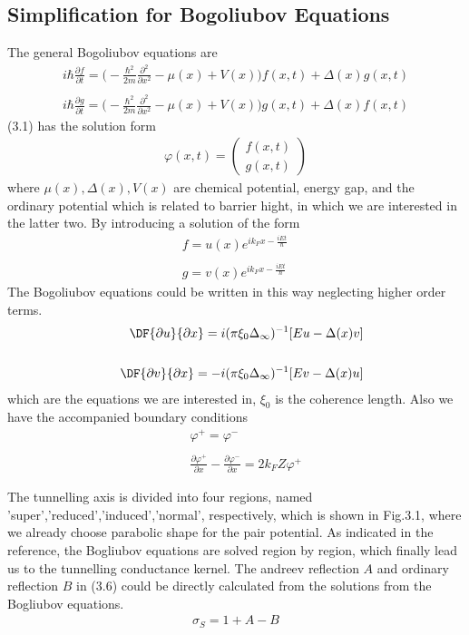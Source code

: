\subsection{Simplification for Bogoliubov Equations}
The general Bogoliubov equations are 
\begin{eqnarray}
i\hbar\frac{\partial f}{\partial t} = \Big(-\frac{\hbar^2}{2m}\frac{\partial^2}{\partial {x^2}}-\mu(x)+V(x)\Big)f(x,t)+\Delta(x)g(x,t)\nonumber\\
\\
i\hbar\frac{\partial g}{\partial t} = \Big(-\frac{\hbar^2}{2m}\frac{\partial^2}{\partial {x^2}}-\mu(x)+V(x)\Big)g(x,t)+\Delta(x)f(x,t)\nonumber
\end{eqnarray}
(3.1) has the solution form 
\begin{eqnarray}
\varphi(x,t)=
\left(\begin{array}{c}
f(x,t)\\
g(x,t)
\end{array}\right)
\end{eqnarray}
where $\mu(x),\Delta(x),V(x)$ are chemical potential, energy gap, and the ordinary potential which is related to barrier hight, in which we are interested in the latter two.
By introducing a solution of the form
\begin{eqnarray}
f=u(x)e^{ik_Fx-\frac{iEt}{\hbar}}\nonumber\\
\\
g=v(x)e^{ik_Fx-\frac{iEt}{\hbar}}\nonumber\
\end{eqnarray}
The Bogoliubov equations could be written in this way neglecting higher order terms\citep{Reference4}.
\begin{eqnarray}
&&\DF{\partial u}{\partial x}=i(\pi \xi_0\Delta_{\infty})^{-1}[Eu-\Delta(x)v]\nonumber\\
&&\\
&&\DF{\partial v}{\partial x}=-i(\pi \xi_0\Delta_{\infty})^{-1}[Ev-\Delta(x)u]\nonumber
\end{eqnarray}
which are the equations we are interested in, $\xi_0$ is the coherence length. Also we have the accompanied boundary conditions
\begin{eqnarray}
&&\varphi^+=\varphi^-\nonumber\\
\\
&&\frac{\partial \varphi^+}{\partial x}-\frac{\partial \varphi^-}{\partial x}=2k_FZ\varphi^+\nonumber
\end{eqnarray}

The tunnelling axis is divided into four regions\citep{Reference4}, named 'super','reduced','induced','normal', respectively, which is shown in Fig.3.1, where we already choose parabolic shape for the pair potential.
As indicated in the reference\citep{Reference4}, the Bogliubov equations are solved region by region, which finally lead us to the tunnelling conductance kernel. The andreev reflection $A$ and ordinary reflection $B$ in (3.6) could be directly calculated from the solutions from the Bogliubov equations.
\begin{eqnarray}
\sigma_S=1+A-B
\end{eqnarray}

